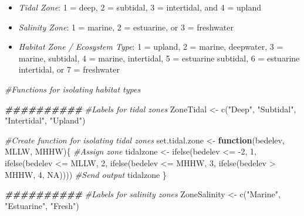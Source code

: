 \documentclass[
]{book}
\newenvironment{Shaded}{\begin{snugshade}}{\end{snugshade}}
\newcommand{\CommentTok}[1]{\textcolor[rgb]{0.56,0.35,0.01}{\textit{#1}}}
\newcommand{\ConstantTok}[1]{\textcolor[rgb]{0.00,0.00,0.00}{#1}}
\newcommand{\ControlFlowTok}[1]{\textcolor[rgb]{0.13,0.29,0.53}{\textbf{#1}}}
\newcommand{\DecValTok}[1]{\textcolor[rgb]{0.00,0.00,0.81}{#1}}
\newcommand{\DocumentationTok}[1]{\textcolor[rgb]{0.56,0.35,0.01}{\textbf{\textit{#1}}}}
\newcommand{\FunctionTok}[1]{\textcolor[rgb]{0.00,0.00,0.00}{#1}}
\newcommand{\NormalTok}[1]{#1}
\newcommand{\OtherTok}[1]{\textcolor[rgb]{0.56,0.35,0.01}{#1}}
\newcommand{\SpecialCharTok}[1]{\textcolor[rgb]{0.00,0.00,0.00}{#1}}
\newcommand{\StringTok}[1]{\textcolor[rgb]{0.31,0.60,0.02}{#1}}
\providecommand{\tightlist}{%
  \setlength{\itemsep}{0pt}\setlength{\parskip}{0pt}}
\begin{document}
\begin{itemize}
\tightlist
\item
  \emph{Tidal Zone}: 1 = deep, 2 = subtidal, 3 = intertidal, and 4 = upland
\item
  \emph{Salinity Zone}: 1 = marine, 2 = estuarine, or 3 = freshwater\\
\item
  \emph{Habitat Zone / Ecosystem Type}: 1 = upland, 2 = marine, deepwater, 3 = marine, subtidal, 4 = marine, intertidal, 5 = estuarine subtidal, 6 = estuarine intertidal, or 7 = freshwater
\end{itemize}

\begin{Shaded}
\begin{Highlighting}[]
\CommentTok{\#Functions for isolating habitat types}

\DocumentationTok{\#\#\#\#\#\#\#\#\#\#}
\CommentTok{\#Labels for tidal zones}
\NormalTok{ZoneTidal }\OtherTok{\textless{}{-}} \FunctionTok{c}\NormalTok{(}\StringTok{"Deep"}\NormalTok{, }\StringTok{"Subtidal"}\NormalTok{, }\StringTok{"Intertidal"}\NormalTok{, }\StringTok{"Upland"}\NormalTok{)}

\CommentTok{\#Create function for isolating tidal zones}
\NormalTok{set.tidal.zone }\OtherTok{\textless{}{-}} \ControlFlowTok{function}\NormalTok{(bedelev, MLLW, MHHW)\{}
  \CommentTok{\#Assign zone}
\NormalTok{  tidalzone }\OtherTok{\textless{}{-}} \FunctionTok{ifelse}\NormalTok{(bedelev }\SpecialCharTok{\textless{}=} \SpecialCharTok{{-}}\DecValTok{2}\NormalTok{, }\DecValTok{1}\NormalTok{,}
          \FunctionTok{ifelse}\NormalTok{(bedelev }\SpecialCharTok{\textless{}=}\NormalTok{ MLLW, }\DecValTok{2}\NormalTok{,}
          \FunctionTok{ifelse}\NormalTok{(bedelev }\SpecialCharTok{\textless{}=}\NormalTok{ MHHW, }\DecValTok{3}\NormalTok{, }
          \FunctionTok{ifelse}\NormalTok{(bedelev }\SpecialCharTok{\textgreater{}}\NormalTok{ MHHW, }\DecValTok{4}\NormalTok{, }\ConstantTok{NA}\NormalTok{))))}
  \CommentTok{\#Send output}
\NormalTok{  tidalzone}
\NormalTok{\}}

\DocumentationTok{\#\#\#\#\#\#\#\#\#\#}
\CommentTok{\#Labels for salinity zones}
\NormalTok{ZoneSalinity }\OtherTok{\textless{}{-}} \FunctionTok{c}\NormalTok{(}\StringTok{"Marine"}\NormalTok{, }\StringTok{"Estuarine"}\NormalTok{, }\StringTok{"Fresh"}\NormalTok{)}


\end{Highlighting}
\end{Shaded}
\end{document}
